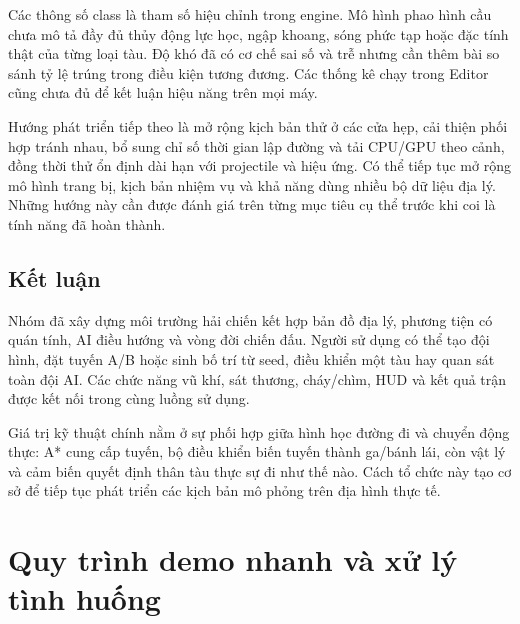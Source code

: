 \documentclass[11pt,a4paper,oneside]{report}
\begin{document}
Các thông số class là tham số hiệu chỉnh trong engine. Mô hình phao hình cầu chưa mô tả đầy đủ thủy động lực học, ngập khoang, sóng phức tạp hoặc đặc tính thật của từng loại tàu. Độ khó đã có cơ chế sai số và trễ nhưng cần thêm bài so sánh tỷ lệ trúng trong điều kiện tương đương. Các thống kê chạy trong Editor cũng chưa đủ để kết luận hiệu năng trên mọi máy.

Hướng phát triển tiếp theo là mở rộng kịch bản thử ở các cửa hẹp, cải thiện phối hợp tránh nhau, bổ sung chỉ số thời gian lập đường và tải CPU/GPU theo cảnh, đồng thời thử ổn định dài hạn với projectile và hiệu ứng. Có thể tiếp tục mở rộng mô hình trang bị, kịch bản nhiệm vụ và khả năng dùng nhiều bộ dữ liệu địa lý. Những hướng này cần được đánh giá trên từng mục tiêu cụ thể trước khi coi là tính năng đã hoàn thành.

\section{Kết luận}
Nhóm đã xây dựng môi trường hải chiến kết hợp bản đồ địa lý, phương tiện có quán tính, AI điều hướng và vòng đời chiến đấu. Người sử dụng có thể tạo đội hình, đặt tuyến A/B hoặc sinh bố trí từ seed, điều khiển một tàu hay quan sát toàn đội AI. Các chức năng vũ khí, sát thương, cháy/chìm, HUD và kết quả trận được kết nối trong cùng luồng sử dụng.

Giá trị kỹ thuật chính nằm ở sự phối hợp giữa hình học đường đi và chuyển động thực: A* cung cấp tuyến, bộ điều khiển biến tuyến thành ga/bánh lái, còn vật lý và cảm biến quyết định thân tàu thực sự đi như thế nào. Cách tổ chức này tạo cơ sở để tiếp tục phát triển các kịch bản mô phỏng trên địa hình thực tế.

\par\endgroup
\appendix
\chapter{Quy trình demo nhanh và xử lý tình huống}
\end{document}
